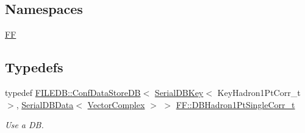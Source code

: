 \subsection*{Namespaces}
\begin{DoxyCompactItemize}
\item 
 \mbox{\hyperlink{namespaceFF}{FF}}
\end{DoxyCompactItemize}
\subsection*{Typedefs}
\begin{DoxyCompactItemize}
\item 
typedef \mbox{\hyperlink{classFILEDB_1_1ConfDataStoreDB}{F\+I\+L\+E\+D\+B\+::\+Conf\+Data\+Store\+DB}}$<$ \mbox{\hyperlink{classADATIO_1_1SerialDBKey}{Serial\+D\+B\+Key}}$<$ Key\+Hadron1\+Pt\+Corr\+\_\+t $>$, \mbox{\hyperlink{classADATIO_1_1SerialDBData}{Serial\+D\+B\+Data}}$<$ \mbox{\hyperlink{group__defs_gab151d837d71acacce0e1c38e91e04fa3}{Vector\+Complex}} $>$ $>$ \mbox{\hyperlink{namespaceFF_a6362d8690a549c09730022375eb4a613}{F\+F\+::\+D\+B\+Hadron1\+Pt\+Single\+Corr\+\_\+t}}
\begin{DoxyCompactList}\small\item\em Use a DB. \end{DoxyCompactList}\end{DoxyCompactItemize}
